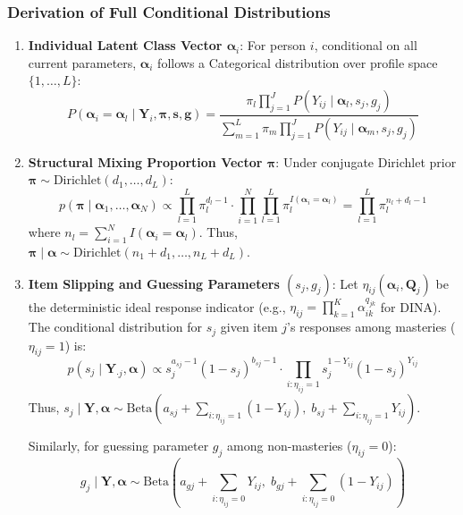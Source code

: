 \documentclass[11pt,a4paper]{article}
\begin{document}
\subsubsection{Derivation of Full Conditional Distributions}

\begin{enumerate}
    \item \textbf{Individual Latent Class Vector $\boldsymbol{\alpha}_i$}:
    For person $i$, conditional on all current parameters, $\boldsymbol{\alpha}_i$ follows a Categorical distribution over profile space $\{1, \dots, L\}$:
    \begin{equation}
    P(\boldsymbol{\alpha}_i = \boldsymbol{\alpha}_l \mid \mathbf{Y}_i, \boldsymbol{\pi}, \mathbf{s}, \mathbf{g}) = \frac{\pi_l \prod_{j=1}^J P(Y_{ij} \mid \boldsymbol{\alpha}_l, s_j, g_j)}{\sum_{m=1}^L \pi_m \prod_{j=1}^J P(Y_{ij} \mid \boldsymbol{\alpha}_m, s_j, g_j)}
    \end{equation}

    \item \textbf{Structural Mixing Proportion Vector $\boldsymbol{\pi}$}:
    Under conjugate Dirichlet prior $\boldsymbol{\pi} \sim \text{Dirichlet}(d_1, \dots, d_L)$:
    \begin{equation}
    p(\boldsymbol{\pi} \mid \boldsymbol{\alpha}_1, \dots, \boldsymbol{\alpha}_N) \propto \prod_{l=1}^L \pi_l^{d_l - 1} \cdot \prod_{i=1}^N \prod_{l=1}^L \pi_l^{I(\boldsymbol{\alpha}_i = \boldsymbol{\alpha}_l)} = \prod_{l=1}^L \pi_l^{n_l + d_l - 1}
    \end{equation}
    where $n_l = \sum_{i=1}^N I(\boldsymbol{\alpha}_i = \boldsymbol{\alpha}_l)$. Thus, $\boldsymbol{\pi} \mid \boldsymbol{\alpha} \sim \text{Dirichlet}(n_1 + d_1, \dots, n_L + d_L)$.

    \item \textbf{Item Slipping and Guessing Parameters $(s_j, g_j)$}:
    Let $\eta_{ij}(\boldsymbol{\alpha}_i, \mathbf{Q}_j)$ be the deterministic ideal response indicator (e.g., $\eta_{ij} = \prod_{k=1}^K \alpha_{ik}^{q_{jk}}$ for DINA).
    The conditional distribution for $s_j$ given item $j$'s responses among masteries ($\eta_{ij} = 1$) is:
    \begin{equation}
    p(s_j \mid \mathbf{Y}_{\cdot j}, \boldsymbol{\alpha}) \propto s_j^{a_{sj} - 1} (1 - s_j)^{b_{sj} - 1} \cdot \prod_{i: \eta_{ij}=1} s_j^{1 - Y_{ij}} (1 - s_j)^{Y_{ij}}
    \end{equation}
    Thus, $s_j \mid \mathbf{Y}, \boldsymbol{\alpha} \sim \text{Beta}\left(a_{sj} + \sum_{i: \eta_{ij}=1}(1 - Y_{ij}), \; b_{sj} + \sum_{i: \eta_{ij}=1} Y_{ij}\right)$.
    
    Similarly, for guessing parameter $g_j$ among non-masteries ($\eta_{ij} = 0$):
    \begin{equation}
    g_j \mid \mathbf{Y}, \boldsymbol{\alpha} \sim \text{Beta}\left(a_{gj} + \sum_{i: \eta_{ij}=0} Y_{ij}, \; b_{gj} + \sum_{i: \eta_{ij}=0} (1 - Y_{ij})\right)
    \end{equation}
\end{enumerate}
\end{document}
